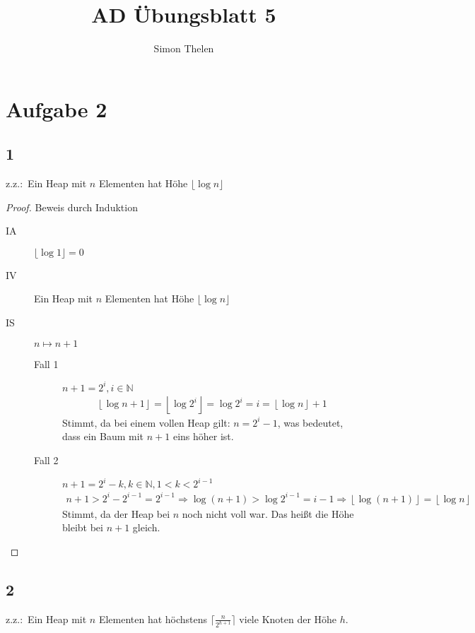 \documentclass[a4paper]{article}
\title{AD Übungsblatt 5}
\author{Simon Thelen}
\newcommand{\floor}[1]{\left\lfloor{}{#1}\right\rfloor}
\begin{document}
    \maketitle

    \section*{Aufgabe 2}
    \label{sec:aufgabe2}

    \subsection*{1}
    \label{subsec:aufgabe2_1}
    z.z.:\  Ein Heap mit $n$ Elementen hat Höhe $\lfloor\log{n}\rfloor$
    \begin{proof}
        Beweis durch Induktion

        \begin{description}
            \item[IA] $\lfloor\log{1}\rfloor = 0$
            \item[IV] Ein Heap mit $n$ Elementen hat Höhe $\lfloor\log{n}\rfloor$
            \item[IS] $n \longmapsto n + 1$
            \begin{description}
                \item[Fall 1] $n + 1 = 2^i, i \in \mathbb{N}$
                \begin{gather*}
                    \floor{\log{n + 1}} = \floor{\log{2^i}} = \log{2^i} = i = \floor{\log{n}} + 1
                \end{gather*}
                Stimmt, da bei einem vollen Heap gilt: $n = 2^i - 1$, was bedeutet, dass ein Baum mit $n + 1$ eins höher ist.
                \item[Fall 2] $n + 1 = 2^i - k, k \in \mathbb{N}, 1 < k < 2^{i - 1}$
                \begin{gather*}
                    n + 1 > 2^i - 2^{i - 1} = 2^{i - 1}
                    \Rightarrow \log{(n + 1)} > \log{2^{i - 1}} = i - 1
                    \Rightarrow \floor{\log{(n + 1)}} = \floor{\log{n}}
                \end{gather*}
                Stimmt, da der Heap bei $n$ noch nicht voll war. Das heißt die Höhe bleibt bei $n + 1$ gleich.
            \end{description}
        \end{description}
    \end{proof}

    \subsection*{2}
    \label{subsec:aufgabe2_2}
    z.z.:\  Ein Heap mit $n$ Elementen hat höchstens $\lceil\frac{n}{2^{h+1}}\rceil$ viele Knoten der Höhe $h$.
\end{document}
